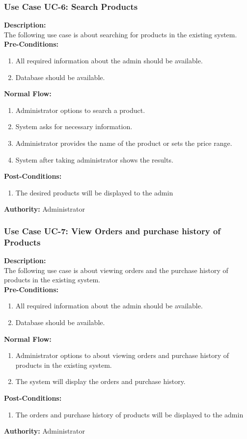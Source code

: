 \subsubsection{ Use Case UC-6: Search Products}
\textbf{Description:}\\
The following use case is about searching for products in the existing system.\\
\textbf{Pre-Conditions:}
\begin{enumerate}
    \item  All required information about the admin should be available.
    \item Database should be available.
\end{enumerate}
\textbf{Normal Flow:}\\
\begin{enumerate}
\item Administrator options to search a product.
\item System asks for necessary information.
\item Administrator provides the name of the product or sets the price range.
\item System after taking administrator shows the results.
\end{enumerate}
\textbf{Post-Conditions: }
\begin{enumerate}
\item	The desired products will be displayed to the admin
\end{enumerate}
\textbf{Authority:}
Administrator
\subsubsection{ Use Case UC-7: View Orders and purchase history of Products}
\textbf{Description:}\\
The following use case is about viewing orders and the purchase history of products in the existing system.
\\
\textbf{Pre-Conditions:}
\begin{enumerate}
    \item  All required information about the admin should be available.
    \item Database should be available.
\end{enumerate}
\textbf{Normal Flow:}\\
\begin{enumerate}
\item Administrator options to about viewing orders and purchase history of products in the existing system.
\item The system will display the orders and purchase history.
\end{enumerate}
\textbf{Post-Conditions: }
\begin{enumerate}
\item	The orders and purchase history of products will be displayed to the admin\end{enumerate}
\textbf{Authority:}
Administrator

